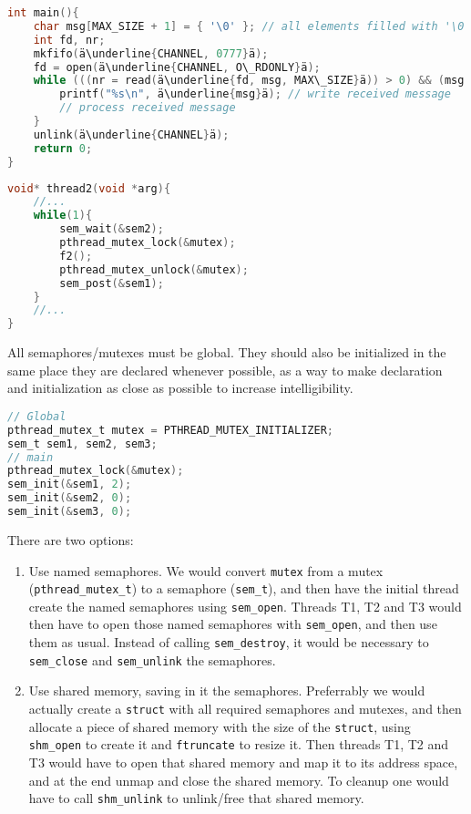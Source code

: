 \documentclass{sope}
\begin{document}
\begin{lstlisting}[language=C,escapechar=ä]
int main(){
    char msg[MAX_SIZE + 1] = { '\0' }; // all elements filled with '\0'
    int fd, nr;
    mkfifo(ä\underline{CHANNEL, 0777}ä);
    fd = open(ä\underline{CHANNEL, O\_RDONLY}ä);
    while (((nr = read(ä\underline{fd, msg, MAX\_SIZE}ä)) > 0) && (msg[0] != '\0')) {
        printf("%s\n", ä\underline{msg}ä); // write received message
        // process received message
    }
    unlink(ä\underline{CHANNEL}ä);
    return 0;
}
\end{lstlisting}

\newpage
{}
\begin{lstlisting}[language=C]
void* thread2(void *arg){
    //...
    while(1){
        sem_wait(&sem2);
        pthread_mutex_lock(&mutex);
        f2();
        pthread_mutex_unlock(&mutex);
        sem_post(&sem1);
    }
    //...
}
\end{lstlisting}

All semaphores/mutexes must be global. They should also be initialized in the same place they are declared whenever possible, as a way to make declaration and initialization as close as possible to increase intelligibility.

\begin{lstlisting}[language=C]
// Global
pthread_mutex_t mutex = PTHREAD_MUTEX_INITIALIZER;
sem_t sem1, sem2, sem3;
// main
pthread_mutex_lock(&mutex);
sem_init(&sem1, 2);
sem_init(&sem2, 0);
sem_init(&sem3, 0);
\end{lstlisting}

There are two options:
\begin{enumerate}
    \item Use named semaphores. We would convert \texttt{mutex} from a mutex (\texttt{pthread\_mutex\_t}) to a semaphore (\texttt{sem\_t}), and then have the initial thread create the named semaphores using \texttt{sem\_open}. Threads T1, T2 and T3 would then have to open those named semaphores with \texttt{sem\_open}, and then use them as usual. Instead of calling \texttt{sem\_destroy}, it would be necessary to \texttt{sem\_close} and \texttt{sem\_unlink} the semaphores.
    \item Use shared memory, saving in it the semaphores. Preferrably we would actually create a \texttt{struct} with all required semaphores and mutexes, and then allocate a piece of shared memory with the size of the \texttt{struct}, using \texttt{shm\_open} to create it and \texttt{ftruncate} to resize it. Then threads T1, T2 and T3 would have to open that shared memory and map it to its address space, and at the end unmap and close the shared memory. To cleanup one would have to call \texttt{shm\_unlink} to unlink/free that shared memory.
\end{enumerate}
\end{document}
